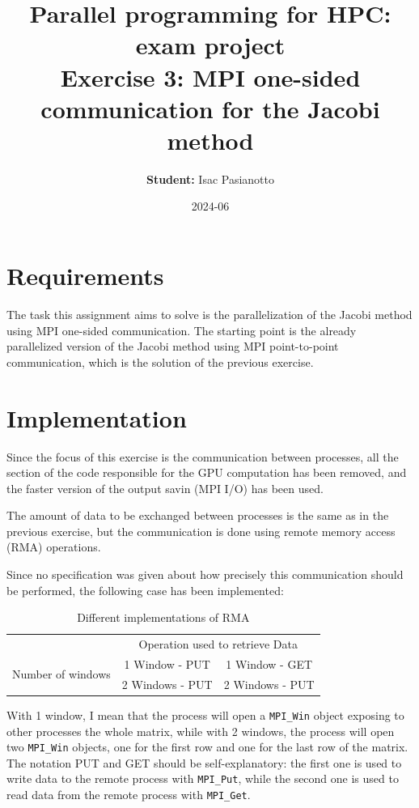 \documentclass{article}
\title{Parallel programming for HPC: exam project\\ Exercise 3: MPI one-sided communication for the Jacobi method}
\author{\textbf{Student:} Isac Pasianotto}
\date{2024-06}
\begin{document}
    \maketitle

    \section{Requirements}

    The task this assignment aims  to solve is the parallelization of the Jacobi method using MPI one-sided communication.
    The starting point is the already parallelized version of the Jacobi method using MPI point-to-point communication, which is the solution of the previous exercise.

   \section{Implementation}

    Since the focus of this exercise is the communication between processes, all the section of the code responsible for the GPU computation has been removed, and
    the faster version of the output savin (MPI I/O) has been used.

    The amount of data to be exchanged between processes is the same as in the previous exercise, but the communication is done using remote memory access (RMA) operations.

    Since no specification was given about how precisely this communication should be performed, the following case has been implemented:

    \begin{table}[h]
        \centering
        \begin{tabular}{@{}lcc@{}}
                                              & \multicolumn{2}{c}{Operation used to retrieve Data} \\ \cmidrule(l){2-3}
          \multirow{2}{*}{Number of windows}  & 1 Window - PUT            & 1 Window - GET            \\ \cmidrule(l){2-3}
                                              & 2 Windows - PUT           & 2 Windows - PUT           \\
        \end{tabular}
        \caption{Different implementations of RMA}
    \end{table}

    With 1 window, I mean that the process will open a \texttt{MPI\_Win} object exposing to other processes the whole matrix, while with 2 windows, the process will open two \texttt{MPI\_Win} objects, one for the first row and one for the last row of the matrix.
    The notation PUT and GET should be self-explanatory: the first one is used to write data to the remote process with \texttt{MPI\_Put}, while the second one is used to read data from the remote process with \texttt{MPI\_Get}.
\end{document}
